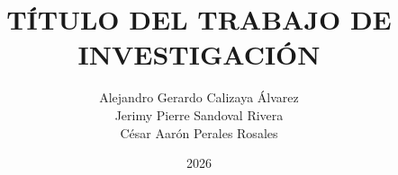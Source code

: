 \documentclass[a4paper,12pt,oneside]{tesisutec}
\begin{document}
\frontmatter


\title{TÍTULO DEL TRABAJO DE INVESTIGACIÓN}

\author{
  Alejandro Gerardo Calizaya Álvarez \\[0.2cm]
  Jerimy Pierre Sandoval Rivera \\[0.2cm]
  César Aarón Perales Rosales 
}

\date{2026}

\maketitle





\tableofcontents
\newpage
\listoftables
\newpage
\listoffigures


\mainmatter
\pagestyle{fancy}














\renewcommand{\bibname}{\hfill\Large\bf{REFERENCIAS BIBLIOGRÁFICAS}\hfill}


\nocite{*}
 

\appendix





\end{document}

